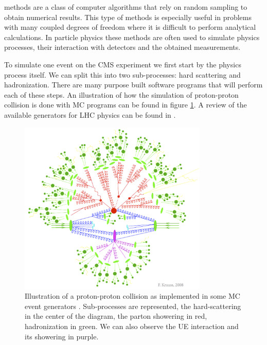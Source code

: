  methods are a class of computer algorithms that rely on random sampling to obtain numerical results. This type of methods is especially useful in problems with many coupled degrees of freedom where it is difficult to perform analytical calculations. In particle physics these methods are often used to simulate physics processes, their interaction with detectors and the obtained measurements.

To simulate one event on the \gls{CMS} experiment we first start by the physics process itself. We can split this into two sub-processes: hard scattering and hadronization. There are many purpose built software programs that will perform each of these steps. An illustration of how the simulation of proton-proton collision is done with \gls{MC} programs can be found in figure \ref{FIGURE:EventReconstructionAndSimulation_MCShower}. A review of the available generators for \gls{LHC} physics can be found in \cite{ARTICLE:GeneralPurposeEventGeneratorsForLHCPhysics}.

\begin{figure}[!htb]
\centering
\includegraphics[width=0.8\textwidth]{Chapter04/MonteCarlo/Images/MCShower.png}
\caption[Illustration a proton-proton collision as implemented in MC event generators.]{Illustration of a proton-proton collision as implemented in some MC event generators \cite{IMAGEREF:krauss-diag}. Sub-processes are represented, the hard-scattering in the center of the diagram, the parton showering in red, hadronization in green. We can also observe the \gls{UE} interaction and its showering in purple.}
\label{FIGURE:EventReconstructionAndSimulation_MCShower}
\end{figure}

